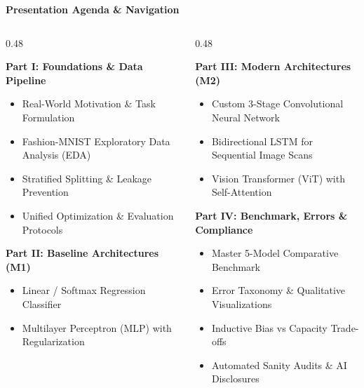 \documentclass[aspectratio=169, 10pt]{beamer}
\begin{document}
\begin{frame}{\textbf{Presentation Agenda \& Navigation}}
  \begin{columns}[t]
    \begin{column}{0.48\textwidth}
      \begin{block}{\textbf{Part I: Foundations \& Data Pipeline}}
        \begin{itemize}\footnotesize
          \item Real-World Motivation \& Task Formulation
          \item Fashion-MNIST Exploratory Data Analysis (EDA)
          \item Stratified Splitting \& Leakage Prevention
          \item Unified Optimization \& Evaluation Protocols
        \end{itemize}
      \end{block}
      \vspace{0.3em}
      \begin{block}{\textbf{Part II: Baseline Architectures (M1)}}
        \begin{itemize}\footnotesize
          \item Linear / Softmax Regression Classifier
          \item Multilayer Perceptron (MLP) with Regularization
        \end{itemize}
      \end{block}
    \end{column}
    \begin{column}{0.48\textwidth}
      \begin{block}{\textbf{Part III: Modern Architectures (M2)}}
        \begin{itemize}\footnotesize
          \item Custom 3-Stage Convolutional Neural Network
          \item Bidirectional LSTM for Sequential Image Scans
          \item Vision Transformer (ViT) with Self-Attention
        \end{itemize}
      \end{block}
      \vspace{0.3em}
      \begin{block}{\textbf{Part IV: Benchmark, Errors \& Compliance}}
        \begin{itemize}\footnotesize
          \item Master 5-Model Comparative Benchmark
          \item Error Taxonomy \& Qualitative Visualizations
          \item Inductive Bias vs Capacity Trade-offs
          \item Automated Sanity Audits \& AI Disclosures
        \end{itemize}
      \end{block}
    \end{column}
  \end{columns}
\end{frame}
\end{document}
